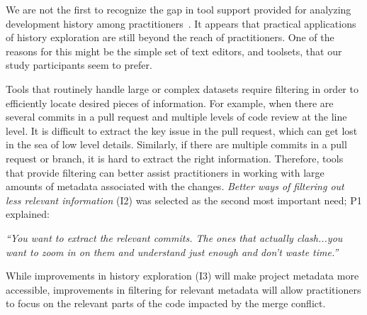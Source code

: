 We are not the first to recognize the gap in tool support provided for analyzing development history among practitioners~\cite{Mihai_lenses, sun2015informationhistory, guo2016cold-start, yan2014miningcontracts}. 
It appears that practical applications of history exploration are still beyond the reach of practitioners. 
One of the reasons for this might be the simple set of text editors, and toolsets, that our study participants seem to prefer.

\label{better_filtering}
Tools that routinely handle large or complex datasets require filtering in order to efficiently locate desired pieces of information.
For example, when there are several commits in a pull request and multiple levels of code review at the line level.
It is difficult to extract the key issue in the pull request, which can get lost in the sea of low level details. Similarly, if there are multiple commits in a pull request or branch, it is hard to extract the right information.
Therefore, tools that provide filtering can better assist practitioners in working with large amounts of metadata associated with the changes.
\textit{Better ways of filtering out less relevant information} (I2) was selected as the second most important need; P1 explained:
\begin{quoting}
\textit{``You want to extract the relevant commits. The ones that actually clash...you want to zoom in on them and understand just enough and don't waste time.''}
\end{quoting}

While improvements in history exploration (I3) will make project metadata more accessible, improvements in filtering for relevant metadata will allow practitioners to focus on the relevant parts of the code impacted by the merge conflict.

